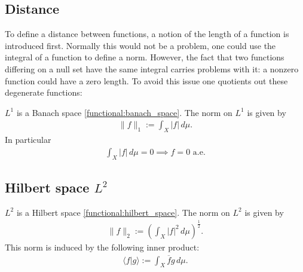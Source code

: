 \subsection{Distance}

    To define a distance between functions, a notion of the length of a function is introduced first. Normally this would not be a problem, one could use the integral of a function to define a norm. However, the fact that two functions differing on a null set have the same integral carries problems with it: a nonzero function could have a zero length. To avoid this issue one quotients out these degenerate functions:
    \begin{property}
        $L^1$ is a Banach space \ref{functional:banach_space}. The norm on $L^1$ is given by
        \begin{gather}
            \label{lebesgue:L1_norm}
            \|f\|_1 := \int_X|f|\,d\mu.
        \end{gather}
        In particular
        \begin{gather}
            \int_X|f|\,d\mu=0\implies f=0\text{ a.e.}
        \end{gather}
    \end{property}

\subsection{Hilbert space \texorpdfstring{$L^2$}{L2}}\label{section:hilbert_space}

    \begin{property}\label{lebesgue:L2_hilbert_space}
        $L^2$ is a Hilbert space \ref{functional:hilbert_space}. The norm on $L^2$ is given by
        \begin{gather}
            \label{lebesgue:L2_norm}
            \|f\|_2 := \left(\int_X|f|^2\,d\mu\right)^{\frac{1}{2}}.
        \end{gather}
        This norm is induced by the following inner product:
        \begin{gather}
            \label{lebesgue:L2_inner_product}
            \langle f|g \rangle := \int_X\overline{f}g\,d\mu.
        \end{gather}
    \end{property}

